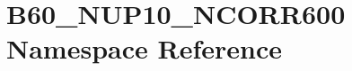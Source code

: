 \hypertarget{namespace_b60___n_u_p10___n_c_o_r_r600}{}\section{B60\+\_\+\+N\+U\+P10\+\_\+\+N\+C\+O\+R\+R600 Namespace Reference}
\label{namespace_b60___n_u_p10___n_c_o_r_r600}
